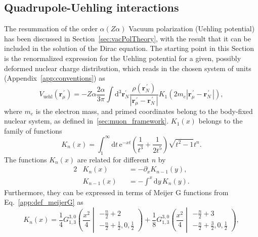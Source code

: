 \subsection{Quadrupole-Uehling interactions}
\label{sec:muon_quadUehl}
The resummation of the order $\alpha (Z\alpha)$ Vacuum polarization (Uehling potential) has been discussed in Section~\ref{sec:vacPolTheory}, with the result that it can be included in the solution of the Dirac equation. The starting point in this Section is the renormalized expression for the Uehling potential for a given, possibly deformed nuclear charge distribution, which reads in the chosen system of units (Appendix~\ref{app:conventions}) as~\cite{Fullerton1976}
\begin{equation}
{V_{\text{uehl}}(\mathbf{r}_\mu^{\,\prime})}{=}{-Z\alpha\frac{2 \alpha}{3\pi} \int \text{d}^3\mathbf{r}_N^{\prime} \frac{\rho(\mathbf{r}_N^{\,\prime})}{|\mathbf{r}_\mu^{\,\prime} - \mathbf{r}_N^{\,\prime}\,|} K_1(2m_e{|\mathbf{r}_\mu^{\,\prime} - \mathbf{r}_N^{\,\prime}\,|}),}
\label{eq:Vvp}
\end{equation}
where $m_e$ is the electron mass, and primed coordinates belong to the body-fixed nuclear system, as defined in~\ref{sec:muon_framework}. $K_1(x)$ belongs to the family of functions
\begin{equation}
K_n(x)=\int_1^\infty \text{d}t\,\text{e}^{-xt}\left(\frac{1}{t^3}+\frac{1}{2t^5}\right)\sqrt{t^2-1}t^n.
\label{eq:defKn}
\end{equation}
The functions $K_n(x)$ are related for different $n$ by
\begin{alignat}{2}
&K_n(x)&&=-\partial_x K_{n-1}(y),\\
&K_{n-1}(x)&&=-\int^x\text{d}y\, K_n(y).
\label{eq:Kninfo}
\end{alignat}
Furthermore, they can be expressed in terms of Meijer G functions from Eq.~\eqref{app:def_meijerG} as
\begin{equation}
K_n(x)=\frac{1}{4} {G_{1, 3}^{3, 0}\left({\frac{x^{2}}{4}}\middle|\begin{matrix}   - \frac{n}{2} + 2 \\- \frac{n}{2} + \frac{1}{2}, 0, \frac{1}{2}   \end{matrix}   \right)} + \frac{1}{8} {G_{1, 3}^{3, 0}\left(\frac{x^2}{4}\middle| \begin{matrix}   - \frac{n}{2} + 3 \\- \frac{n}{2} + \frac{3}{2}, 0, \frac{1}{2}   \end{matrix}  \right)},
\label{eq:defKnAnalyt}
\end{equation}
